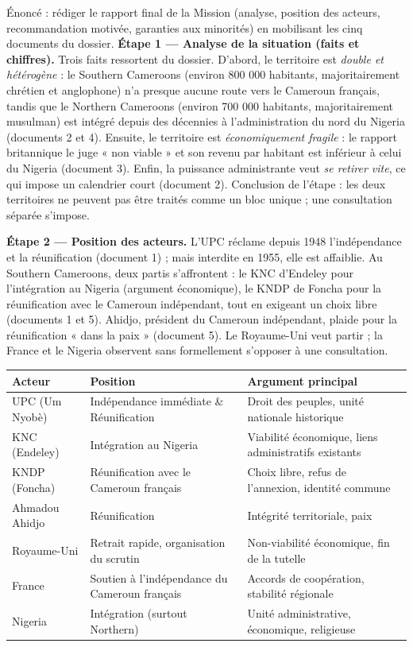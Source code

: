 \documentclass[11pt]{article}
\begin{document}
\begin{exoresolu}
Énoncé : rédiger le rapport final de la Mission (analyse, position des acteurs, recommandation motivée, garanties aux minorités) en mobilisant les cinq documents du dossier.
\tcblower
\textbf{Étape 1 — Analyse de la situation (faits et chiffres).} Trois faits ressortent du dossier. D'abord, le territoire est \emph{double et hétérogène} : le Southern Cameroons (environ 800 000 habitants, majoritairement chrétien et anglophone) n'a presque aucune route vers le Cameroun français, tandis que le Northern Cameroons (environ 700 000 habitants, majoritairement musulman) est intégré depuis des décennies à l'administration du nord du Nigeria (documents 2 et 4). Ensuite, le territoire est \emph{économiquement fragile} : le rapport britannique le juge « non viable » et son revenu par habitant est inférieur à celui du Nigeria (document 3). Enfin, la puissance administrante veut \emph{se retirer vite}, ce qui impose un calendrier court (document 2). Conclusion de l'étape : les deux territoires ne peuvent pas être traités comme un bloc unique ; une consultation séparée s'impose.

\textbf{Étape 2 — Position des acteurs.} L'UPC réclame depuis 1948 l'indépendance et la réunification (document 1) ; mais interdite en 1955, elle est affaiblie. Au Southern Cameroons, deux partis s'affrontent : le KNC d'Endeley pour l'intégration au Nigeria (argument économique), le KNDP de Foncha pour la réunification avec le Cameroun indépendant, tout en exigeant un choix libre (documents 1 et 5). Ahidjo, président du Cameroun indépendant, plaide pour la réunification « dans la paix » (document 5). Le Royaume-Uni veut partir ; la France et le Nigeria observent sans formellement s'opposer à une consultation.

\begin{center}
\begin{tabularx}{\linewidth}{|l|X|X|}\hline
\rowcolor{popblueL}
\textbf{Acteur} & \textbf{Position} & \textbf{Argument principal} \\ \hline
UPC (Um Nyobè) & Indépendance immédiate \& Réunification & Droit des peuples, unité nationale historique \\ \hline
KNC (Endeley) & Intégration au Nigeria & Viabilité économique, liens administratifs existants \\ \hline
KNDP (Foncha) & Réunification avec le Cameroun français & Choix libre, refus de l'annexion, identité commune \\ \hline
Ahmadou Ahidjo & Réunification & Intégrité territoriale, paix \\ \hline
Royaume-Uni & Retrait rapide, organisation du scrutin & Non-viabilité économique, fin de la tutelle \\ \hline
France & Soutien à l'indépendance du Cameroun français & Accords de coopération, stabilité régionale \\ \hline
Nigeria & Intégration (surtout Northern) & Unité administrative, économique, religieuse \\ \hline
\end{tabularx}
\end{center}


\end{exoresolu}
\end{document}
